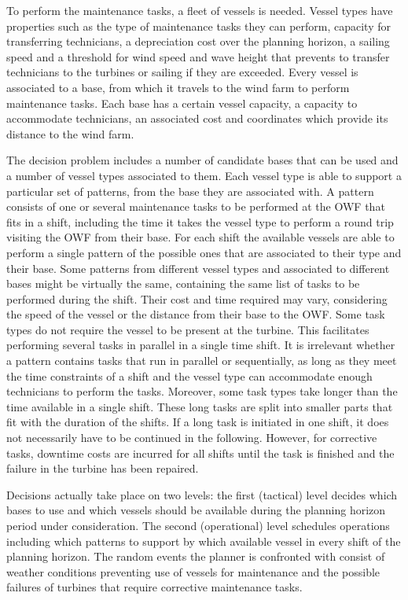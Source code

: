 To perform the maintenance tasks, a fleet of vessels is needed. Vessel types have properties such as the type of maintenance tasks they can perform, capacity for transferring technicians, a depreciation cost over the planning horizon, a sailing speed and a threshold for wind speed and wave height that prevents to transfer technicians to the turbines or sailing if they are exceeded. Every vessel is associated to a base, from which it travels to the wind farm to perform maintenance tasks. Each base has a certain vessel capacity, a capacity to accommodate technicians, an associated cost and coordinates which provide its distance to the wind farm. 

The decision problem includes a number of candidate bases that can be used and a number of vessel types associated to them. Each vessel type is able to support a particular set of patterns, from the base they are associated with. A pattern consists of one or several maintenance tasks to be performed at the OWF that fits in a shift, including the time it takes the vessel type to perform a round trip visiting the OWF from their base. For each shift the available vessels are able to perform a single pattern of the possible ones that are associated to their type and their base. Some patterns from different vessel types and associated to different bases might be virtually the same, containing the same list of tasks to be performed during the shift. Their cost and time required may vary, considering the speed of the vessel or the distance from their base to the OWF.  Some task types do not require the vessel to be present at the turbine. This facilitates performing several tasks in parallel in a single time shift. It is irrelevant whether  a pattern contains tasks that run in parallel or sequentially, as long as they meet the time constraints of a shift and the vessel type can accommodate enough technicians to perform the tasks. Moreover, some task types take longer than the time available in a single shift. These long tasks are split into smaller parts that fit with the duration of the shifts. If a long task is initiated in one shift, it does not necessarily have to be continued in the following. However, for corrective tasks, downtime costs are incurred for all shifts until the task is finished and the failure in the turbine has been repaired.

Decisions actually take place on two levels: the first (tactical) level decides which bases to use and which vessels should be available during the planning horizon period under consideration. The second (operational) level schedules operations  including which patterns to support by which available vessel in every shift of the planning horizon. The random events the planner is confronted with consist of weather conditions preventing use of vessels for maintenance and the possible failures of turbines that require corrective maintenance tasks.



